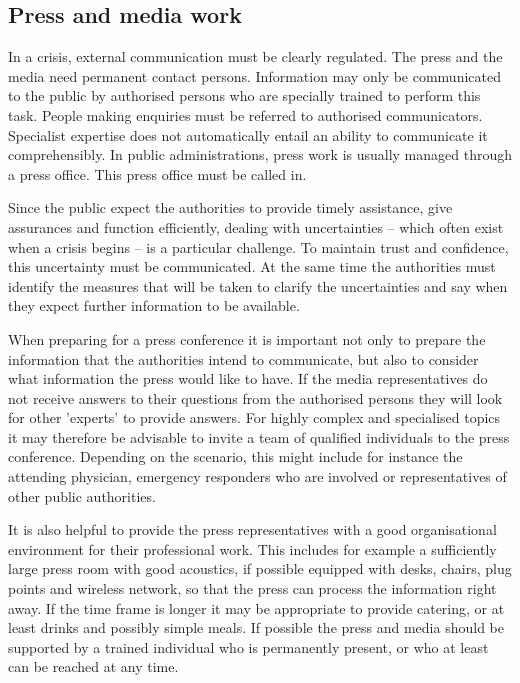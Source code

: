 \documentclass{article}
\begin{document}
\subsection{Press and media work}\label{H3071540}



In a crisis, external communication must be clearly regulated. The press and the media need permanent contact persons. Information may only be communicated to the public by authorised persons who are specially trained to perform this task. People making enquiries must be referred to authorised communicators. Specialist expertise does not automatically entail an ability to communicate it comprehensibly. In public administrations, press work is usually managed through a press office. This press office must be called in.


Since the public expect the authorities to provide timely assistance, give assurances and function efficiently, dealing with uncertainties – which often exist when a crisis begins – is a particular challenge. To maintain trust and confidence, this uncertainty must be communicated. At the same time the authorities must identify the measures that will be taken to clarify the uncertainties and say when they expect further information to be available.


When preparing for a press conference it is important not only to prepare the information that the authorities intend to communicate, but also to consider what information the press would like to have. If the media representatives do not receive answers to their questions from the authorised persons they will look for other 'experts' to provide answers. For highly complex and specialised topics it may therefore be advisable to invite a team of qualified individuals to the press conference. Depending on the scenario, this might include for instance the attending physician, emergency responders who are involved or representatives of other public authorities.


It is also helpful to provide the press representatives with a good organisational environment for their professional work. This includes for example a sufficiently large press room with good acoustics, if possible equipped with desks, chairs, plug points and wireless network, so that the press can process the information right away. If the time frame is longer it may be appropriate to provide catering, or at least drinks and possibly simple meals. If possible the press and media should be supported by a trained individual who is permanently present, or who at least can be reached at any time.
\end{document}
